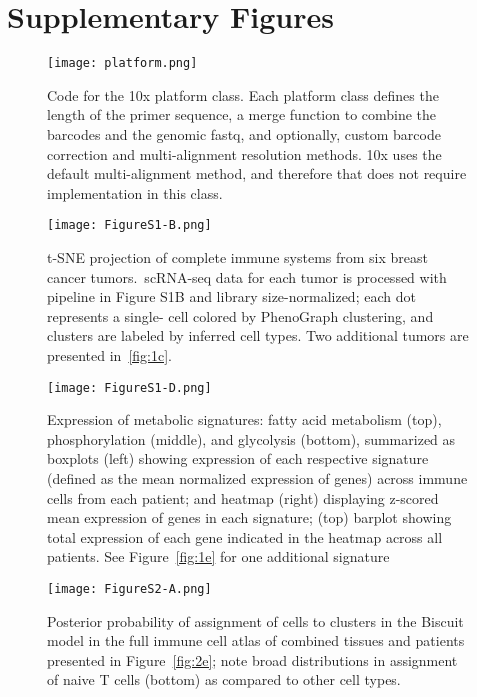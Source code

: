 
\chapter*[Supplementary Figures]{Supplementary Figures}

\begin{figure}
\centering
\texttt{[image: platform.png]}
\caption{Code for the 10x platform class. Each platform class defines the length of the primer sequence, a merge function to combine the barcodes and the genomic fastq, and optionally, custom barcode correction and multi-alignment resolution methods. 10x uses the default multi-alignment method, and therefore that does not require implementation in this class.}

\label{fig:10x_platform}
\end{figure}

\begin{figure}
\centering
\texttt{[image: FigureS1-B.png]}
\caption{t-SNE projection of complete immune systems from six breast cancer tumors.\ scRNA-seq data for each tumor is processed with pipeline in Figure S1B and library size-normalized; each dot represents a single- cell colored by PhenoGraph clustering, and clusters are labeled by inferred cell types. Two additional tumors are presented in~\ref{fig:1c}.
}
\label{fig:s1b}
\end{figure}

\begin{figure}
\centering
\texttt{[image: FigureS1-D.png]}
\caption{Expression of metabolic signatures: fatty acid metabolism (top), phosphorylation (middle), and glycolysis (bottom), summarized as boxplots (left) showing expression of each respective signature (defined as the mean normalized expression of genes)  across immune cells from each patient; and heatmap (right) displaying z-scored mean expression of genes in each signature; (top) barplot showing total expression of each gene indicated in the heatmap across all patients. See Figure~\ref{fig:1e} for one additional signature
}
\label{fig:s1d}
\end{figure}

\begin{figure}
\centering
\texttt{[image: FigureS2-A.png]}
\caption{Posterior probability of assignment of cells to clusters in the Biscuit model in the full immune cell atlas of combined tissues and patients presented in Figure~\ref{fig:2e}; note broad distributions in assignment of naive T cells (bottom) as compared to other cell types.
}
\label{fig:s2a}
\end{figure}

